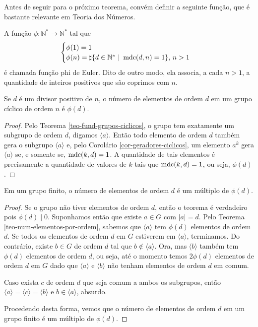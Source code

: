 %
Antes de seguir para o próximo teorema, convém definir a seguinte função, que é bastante relevante
em Teoria dos Números.
%
\begin{definition}
\label{def-funcao-phi-euler}
    A função $\phi:\mathbb{N}^*\to\mathbb{N}^*$ tal que
    \[
    \begin{cases}
        \phi(1) = 1 \\
        \phi(n) = \sharp\{ d\in\mathbb{N}^* \ | \ \operatorname{mdc}(d,n) = 1 \}, \, n>1
    \end{cases}
    \]
    é chamada função phi de Euler. Dito de outro modo, ela associa, a cada $n>1$, a quantidade
    de inteiros positivos que são coprimos com $n$.
\end{definition}
%
\begin{theorem}
\label{teo-num-elementos-por-ordem}
    Se $d$ é um divisor positivo de $n$, o número de elementos de ordem $d$ em um grupo
    cíclico de ordem $n$ é $\phi(d)$.
\end{theorem}
%
\begin{proof}
    Pelo Teorema \ref{teo-fund-grupos-ciclicos}, o grupo tem exatamente um subgrupo de ordem $d$, digamos
    $\langle a \rangle$. Então todo elemento de ordem $d$ também gera o subgrupo $\langle a \rangle$ e,
    pelo Corolário \ref{cor-geradores-ciclicos}, um elemento $a^k$ gera $\langle a \rangle$ se, e somente
    se, $\operatorname{mdc}(k,d) = 1$. A quantidade de tais elementos é precisamente a quantidade de valores de $k$ tais
    que $\operatorname{mdc}(k,d) = 1$, ou seja, $\phi(d)$.
\end{proof}
%
\begin{corollary}
\label{cor-num-elementos-por-ordem}
    Em um grupo finito, o número de elementos de ordem $d$ é um múltiplo de $\phi(d)$.
\end{corollary}
%
\begin{proof}
    Se o grupo não tiver elementos de ordem $d$, então o teorema é verdadeiro pois $\phi(d)\mid 0$.
    Suponhamos então que existe $a\in G$ com $|a| = d$. Pelo Teorema \ref{teo-num-elementos-por-ordem},
    sabemos que $\langle a \rangle$ tem $\phi(d)$ elementos de ordem $d$. Se todos os elementos de ordem
    $d$ em $G$ estiverem em $\langle a \rangle$, terminamos. Do contrário, existe $b\in G$ de ordem $d$
    tal que $b\notin\langle a \rangle$. Ora, mas $\langle b \rangle$ também tem $\phi(d)$ elementos
    de ordem $d$, ou seja, até o momento temos $2\phi(d)$ elementos de ordem $d$ em $G$ dado que
    $\langle a \rangle$ e $\langle b \rangle$ não tenham elementos de ordem $d$ em comum.
    
    Caso exista $c$ de ordem $d$ que seja comum a ambos os subgrupos, então 
    $\langle a \rangle = \langle c \rangle = \langle b \rangle$ e $b\in\langle a \rangle$, absurdo.
    
    Procedendo desta forma, vemos que o número de elementos de ordem $d$ em um grupo finito
    é um múltiplo de $\phi(d)$.
\end{proof}
%


